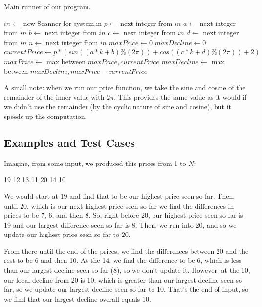 \documentclass[12pt]{article}
\begin{document}
\begin{algorithm}[H]
\caption{Main runner of our program.}
\begin{algorithmic}
        \State $in \gets$ new Scanner for system.in
            \State $p \gets$ next integer from $in$
            \State $a \gets$ next integer from $in$
            \State $b \gets$ next integer from $in$
            \State $c \gets$ next integer from $in$
            \State $d \gets$ next integer from $in$
            \State $n \gets$ next integer from $in$
            \State $maxPrice \gets 0$
            \State $maxDecline \gets 0$
                \State $currentPrice \gets p * (sin((a * k + b) \% (2\pi)) + cos((c * k + d) \% (2\pi)) + 2)$
                \State $maxPrice \gets$ max between $maxPrice, currentPrice$
                \State $maxDecline \gets$ max between $maxDecline, maxPrice - currentPrice$
            \EndFor
        \EndWhile
    \EndProcedure
\end{algorithmic}
\end{algorithm}

A small note: when we run our price function, we take the sine and
cosine of the remainder of the inner value with $2\pi$. This provides
the same value as it would if we didn't use the remainder (by the
cyclic nature of sine and cosine), but it speeds up the computation.

\subsection{Examples and Test Cases}

Imagine, from some input, we produced this prices from
1 to $N$:

\begin{center}
    19 12 13 11 20 14 10
\end{center}

We would start at 19 and find that to be our highest price seen
so far. Then, until 20, which is our next highest price seen so far
we find the differences in prices to be 7, 6, and then 8. So, right
before 20, our highest price seen so far is 19 and our largest
difference seen so far is 8. Then, we run into 20, and so we update
our highest price seen so far to 20.

From there until the end of the prices, we find the differences
between 20 and the rest to be 6 and then 10. At the 14, we find
the difference to be 6, which is less than our largest decline
seen so far (8), so we don't update it. However, at the 10,
our local decline from 20 is 10, which is greater than our largest
decline seen so far, so we update our largest decline seen so far
to 10. That's the end of input, so we find that our largest
decline overall equals 10.
\end{document}
